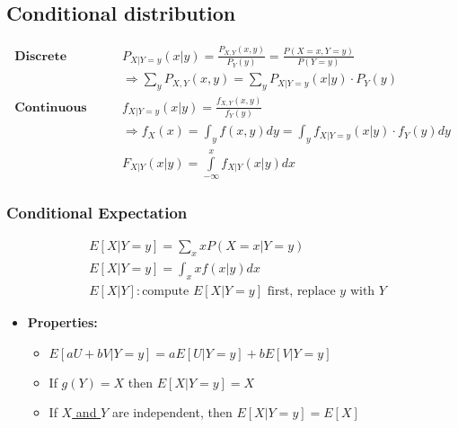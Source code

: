 \subsection*{Conditional distribution}
\begin{align*}
	\textbf{Discrete} \quad \quad
	& P_{X|Y=y}(x|y) = \frac{P_{X,Y}(x,y)}{P_Y(y)} = \frac{P(X=x, Y=y)}{P(Y=y)}\\
  & \Rightarrow \sum\limits_y P_{X,Y}(x,y) = \sum\limits_y P_{X|Y=y}(x|y) \cdot P_Y(y)\\
  \textbf{Continuous} \quad \quad & f_{X|Y=y}(x|y) = \frac{f_{X,Y}(x,y)}{f_Y(y)}\\
  & \Rightarrow f_X(x) = \int_y f(x,y)dy = \int_y f_{X|Y=y}(x|y)\cdot f_Y(y)dy\\
  & F_{X|Y}(x|y) = \int\limits_{-\infty}^x f_{X|Y}(x|y) dx
\end{align*}
\begin{center}
	 \hspace{5em}
\end{center}
\subsubsection*{Conditional Expectation}
\begin{align*}
	& E[X|Y=y] = \sum\limits_x xP(X = x | Y = y)\\
	& E[X|Y=y] = \int_x xf(x|y) dx\\
	& E[X|Y]: \text{compute } E[X|Y=y] \text{ first, replace $y$ with $Y$}
\end{align*}
\begin{itemize}
	\item \textbf{Properties: }
	\begin{itemize}
		\item $E[aU + bV | Y = y] = aE[U|Y=y] + bE[V|Y=y]$ \qquad {}
		\item If $g(Y) = X$ then $E[X|Y=y] = X$
		\item If \underline{$X$ and $Y$} are independent, then $E[X|Y=y] = E[X]$
	\end{itemize}
\end{itemize}
